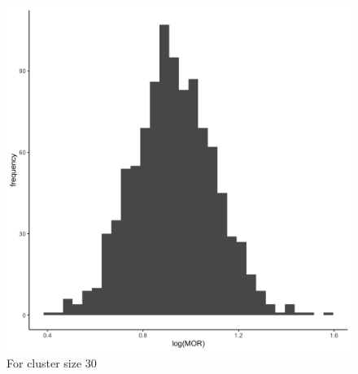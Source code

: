 \documentclass[
  letterpaper,
  DIV=11,
  numbers=noendperiod,
  titlepage]{scrartcl}
\begin{document}
\begin{figure}
\begin{minipage}[t]{0.50\linewidth}
{{\includegraphics{../../plots/two-lvl-ran-slope/high-prev/hist_50_30_two_lvl_slp_high_prev.png}

}

\caption{For cluster size 30}

}

\end{minipage}%
%
\begin{minipage}[t]{0.50\linewidth}

{\centering 

}
\end{minipage}
\end{figure}
\end{document}
